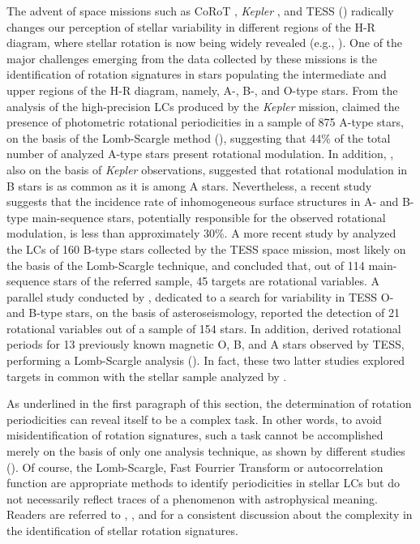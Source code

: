 \documentclass[RNAAS]{aastex63}
\begin{document}
The advent of space missions such as CoRoT \citep{Baglin2009}, {\em Kepler} \citep{Borucki2010}, and TESS (\citealp{Ricker2015}) radically changes our perception of stellar variability in different regions of the H-R diagram, where stellar rotation is now being widely revealed (e.g.,  \citealp{deMedeiros2013,Reinhold2013,McQuillan2014,Canto2020}). One of the major challenges emerging from the data collected by these missions is the identification of rotation signatures in stars populating the intermediate and upper regions of the H-R diagram, namely, A-, B-, and O-type stars. From the analysis of the high-precision LCs produced by the {\em Kepler} mission, \citet{Balona2013} claimed the presence of photometric rotational periodicities in a sample of 875 A-type stars, on the basis of the Lomb-Scargle method (\citealp{Scargle1982,Horne1986,Press1989}), suggesting that 44\% of the total number of analyzed A-type stars present rotational modulation. In addition, \citet{Balona2016}, also on the basis of {\em Kepler} observations, suggested that rotational modulation in B stars is as common as it is among A stars. Nevertheless, a recent study \citep{Sikora2020} suggests that the incidence rate of inhomogeneous surface structures in A- and B-type main-sequence stars, potentially responsible for the observed rotational modulation, is less than approximately 30\%. A more recent study by \citet{Balona2019} analyzed the LCs of 160 B-type stars collected by the TESS space mission, most likely on the basis of the Lomb-Scargle technique, and concluded that, out of 114 main-sequence stars of the referred sample, 45 targets are rotational variables. A parallel study conducted by \citet{Pedersen2019}, dedicated to a search for variability in TESS O- and B-type stars, on the basis of asteroseismology, reported the detection of 21 rotational variables out of a sample of 154 stars. In addition, \citet{David2019} derived rotational periods for 13 previously known magnetic O, B, and A stars observed by TESS, performing a Lomb-Scargle analysis (\citealp{Lomb1976,Scargle1982}). In fact, these two latter studies explored targets in common with the stellar sample analyzed by \citet{Balona2019}. 

As underlined in the first paragraph of this section, the determination of rotation periodicities can reveal itself to be a complex task. In other words, to avoid misidentification of rotation signatures, such a task cannot be accomplished merely on the basis of only one analysis technique, as shown by different studies (\citealp{deMedeiros2013,Weingrill2015,Basri2018,Canto2020,Tan2020}). Of course, the Lomb-Scargle, Fast Fourrier Transform or autocorrelation function are appropriate methods to identify periodicities in stellar LCs but do not necessarily reflect traces of a phenomenon with astrophysical meaning. Readers are referred to \citet{deMedeiros2013}, \citet{Canto2020}, and \citet{Tan2020} for a consistent discussion about the complexity in the identification of stellar rotation signatures. 
\end{document}
